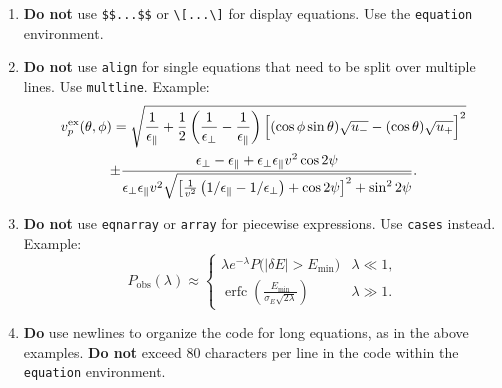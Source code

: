 \documentclass[
    prd, superscriptaddress, nofootinbib, amsmath, amssymb,
    aps, floatfix, preprintnumbers
]{revtex4-2}
\begin{document}
\begin{enumerate}
    \item \textbf{Do not} use \verb|$$...$$| or \verb|\[...\]| for display equations. Use the \texttt{equation} environment.
    \item \textbf{Do not} use \texttt{align} for single equations that need to be split over multiple lines. Use \texttt{multline}. Example:
    \begin{multline}
        \label{eq:multi-line-equation}
        v_p^{{\mathrm{ex}}}(\theta,\phi) = \sqrt{
            \frac1{\epsilon_\parallel} +
            \frac12\left(
                \frac{1}{\epsilon_\perp} - \frac{1}{\epsilon_\parallel}
            \right)\Bigl[
            (\cos\phi\sin\theta)\sqrt{u_-} - (\cos\theta) \sqrt{u_+}
        \Bigr]^2}
        \\
        \pm \frac{
            \epsilon_\perp - \epsilon_\parallel
            + \epsilon_\perp \epsilon_\parallel v^2\cos2\psi
        }{
            \epsilon_\perp \epsilon_\parallel v^2\sqrt{
                \left[
                    \frac{1}{v^2}\left(
                            1/\epsilon_\parallel
                            - 1/\epsilon_\perp
                    \right) + \cos2\psi
                \right]^2 + \sin^2 2\psi
            }
        }
        .
    \end{multline}
    \item \textbf{Do not} use \texttt{eqnarray} or \texttt{array} for piecewise expressions. Use \texttt{cases} instead. Example:
    \begin{equation}
        \label{eq:piecewise-expression}
        P_{\mathrm{obs}}(\lambda) \approx \begin{cases}
            \displaystyle
            \lambda e^{-\lambda} P\bigl(\left|\delta E\right| > E_{\min}\bigr)
            & \lambda \ll 1, \\[3mm]\displaystyle
            \operatorname{erfc}\left(
                \frac{E_{\min}}{\sigma_E\sqrt{2\lambda}}\right)
            & \lambda \gg 1.
        \end{cases}
    \end{equation}
    \item \textbf{Do} use newlines to organize the code for long equations, as in the above examples. \textbf{Do not} exceed 80 characters per line in the code within the \texttt{equation} environment.
\end{enumerate}
\end{document}
